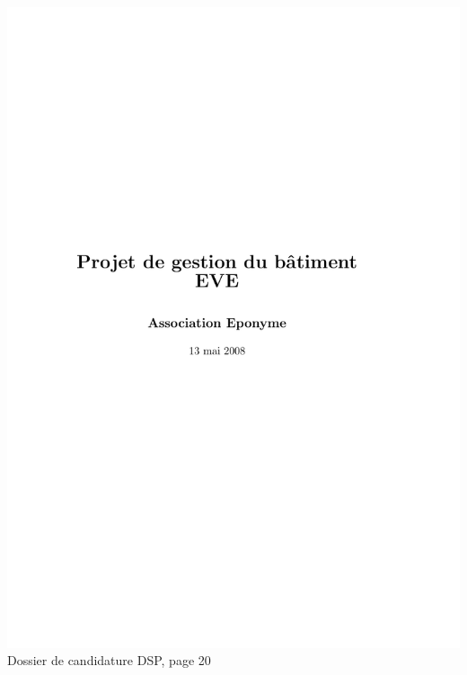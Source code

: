 \includegraphics[scale=0.85,trim=20mm 20mm 20mm 20mm,clip,page=20]{annexes/candidature_dsp.pdf} \\
Dossier de candidature DSP, page 20
\newpage
